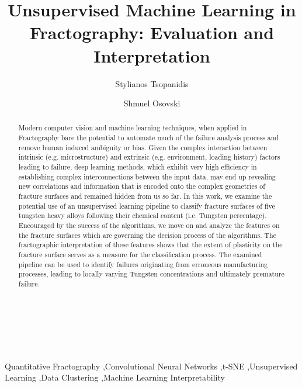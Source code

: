\documentclass[authoryear,preprint,review,12pt, singleside]{elsarticle}
\begin{document}

\begin{frontmatter}
	
	
	\title{Unsupervised Machine Learning in Fractography: Evaluation and Interpretation}


​	
​	
	\author[UC3M]{Stylianos Tsopanidis}
	\author[TEC]{Shmuel Osovski}


​	
​	
	\address [UC3M]{Department of Continuum Mechanics and Structural Analysis. University Carlos III of Madrid. Avda. de la Universidad, 30. 28911 Legan{\'e}s, Madrid, Spain}
	\address [TEC]{Faculty of Mechanical Engineering, Technion - Israel Institute of Technology, Haifa, Israel}

\begin{abstract}
Modern computer vision and machine learning techniques, when applied in Fractography bare the potential to automate much of the failure analysis process and remove human induced ambiguity or bias. Given the complex interaction between intrinsic (e.g. microstructure) and extrinsic (e.g. environment, loading history) factors leading to failure, deep learning methods, which exhibit very high efficiency in establishing complex interconnections between the input data, may end up revealing new correlations and  information that is encoded onto the complex geometries of fracture surfaces and remained hidden from us so far.  In this work, we examine the potential use of an unsupervised learning pipeline to classify fracture surfaces of five tungsten heavy alloys following their chemical content (i.e. Tungsten percentage). Encouraged by the success of the algorithms, we move on and analyze the features on the fracture surfaces which are governing the decision process of the algorithms.  The fractographic interpretation of these features shows that the extent of plasticity on the fracture surface serves as a measure for the classification process. The examined pipeline can be used to identify failures originating from erroneous manufacturing processes, leading to locally varying Tungsten concentrations and ultimately premature failure. 	
	
	
\end{abstract}




\begin{keyword}	
	
	Quantitative Fractography \sep Convolutional Neural Networks \sep t-SNE \sep Unsupervised Learning \sep Data Clustering  \sep Machine Learning Interpretability 

\end{keyword}





\end{frontmatter}
\end{document}
